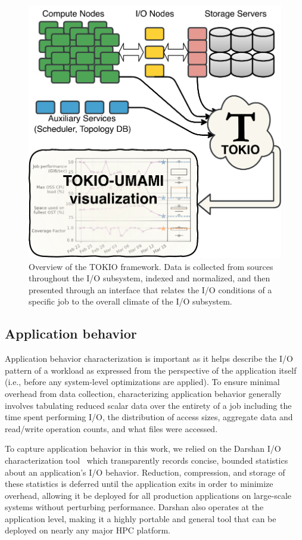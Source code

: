 \begin{figure}[t]
    \centering
    \includegraphics[width=.9\columnwidth]{figs/tokio-schematic.pdf}
    \caption{Overview of the TOKIO framework.  Data is collected from sources
    throughout the I/O subsystem, indexed and normalized, and then presented
    through an interface that relates the I/O conditions of a specific job to the overall climate of the I/O subsystem.}
    \label{fig:tokio-schematic}
\vspace{-.2in}
\end{figure}

\subsection{Application behavior} \label{sec:methods/darshan}

Application behavior characterization is important as it helps describe the I/O pattern of a workload as expressed from the perspective of the application itself (i.e., before any system-level optimizations are applied).
To ensure minimal overhead from data collection, characterizing application behavior generally involves tabulating reduced scalar data over the entirety of a job including the time spent performing I/O, the distribution of access sizes, aggregate data and read/write operation counts, and what files were accessed.

To capture application behavior in this work, we relied on the Darshan I/O characterization tool~\cite{carns200924} which transparently records concise, bounded statistics about an application's I/O behavior.
Reduction, compression, and storage of these statistics is deferred until the application exits in order to minimize overhead, allowing it be deployed for all production applications on large-scale systems without perturbing performance.
Darshan also operates at the application level, making it a highly portable and general tool that can be deployed on nearly any major HPC platform.

